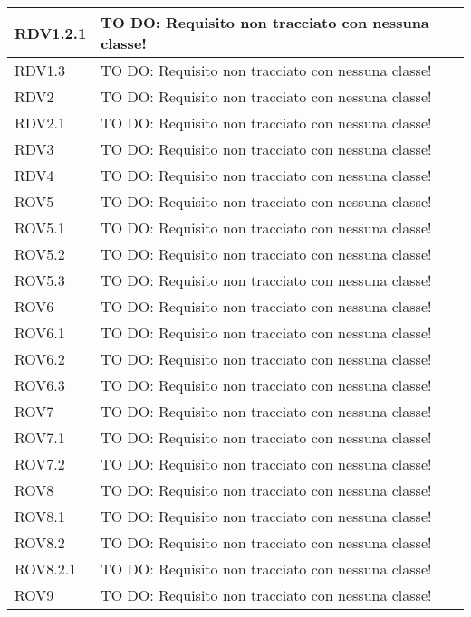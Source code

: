 \begin{center}
\begin{longtable}{| p{2.5cm} | p{11cm} |}
\hline
RDV1.2.1 & TO DO: Requisito non tracciato con nessuna classe! \\
\hline
RDV1.3 & TO DO: Requisito non tracciato con nessuna classe! \\
\hline
RDV2 & TO DO: Requisito non tracciato con nessuna classe! \\
\hline
RDV2.1 & TO DO: Requisito non tracciato con nessuna classe! \\
\hline
RDV3 & TO DO: Requisito non tracciato con nessuna classe! \\
\hline
RDV4 & TO DO: Requisito non tracciato con nessuna classe! \\
\hline
ROV5 & TO DO: Requisito non tracciato con nessuna classe! \\
\hline
ROV5.1 & TO DO: Requisito non tracciato con nessuna classe! \\
\hline
ROV5.2 & TO DO: Requisito non tracciato con nessuna classe! \\
\hline
ROV5.3 & TO DO: Requisito non tracciato con nessuna classe! \\
\hline
ROV6 & TO DO: Requisito non tracciato con nessuna classe! \\
\hline
ROV6.1 & TO DO: Requisito non tracciato con nessuna classe! \\
\hline
ROV6.2 & TO DO: Requisito non tracciato con nessuna classe! \\
\hline
ROV6.3 & TO DO: Requisito non tracciato con nessuna classe! \\
\hline
ROV7 & TO DO: Requisito non tracciato con nessuna classe! \\
\hline
ROV7.1 & TO DO: Requisito non tracciato con nessuna classe! \\
\hline
ROV7.2 & TO DO: Requisito non tracciato con nessuna classe! \\
\hline
ROV8 & TO DO: Requisito non tracciato con nessuna classe! \\
\hline
ROV8.1 & TO DO: Requisito non tracciato con nessuna classe! \\
\hline
ROV8.2 & TO DO: Requisito non tracciato con nessuna classe! \\
\hline
ROV8.2.1 & TO DO: Requisito non tracciato con nessuna classe! \\
\hline
ROV9 & TO DO: Requisito non tracciato con nessuna classe! \\
\hline
\end{longtable}
\egroup
\end{center}
